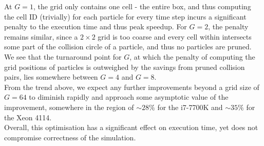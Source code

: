 \documentclass[12pt]{article}
\begin{document}
At $G = 1$, the grid only contains one cell - the entire box, and thus computing the cell ID (trivially) for each particle for every time step incurs a significant penalty to the execution time and thus peak speedup. For $G = 2$, the penalty remains similar, since a $2\times2$ grid is too coarse and every cell within intersects some part of the collision circle of a particle, and thus no particles are pruned. \\

We see that the turnaround point for $G$, at which the penalty of computing the grid positions of particles is outweighed by the savings from pruned collision pairs, lies somewhere between $G = 4$ and $G = 8$. \\

From the trend above, we expect any further improvements beyond a grid size of $G = 64$ to diminish rapidly and approach some asymptotic value of the improvement, somewhere in the region of $\sim28\%$ for the i7-7700K and $\sim35\%$ for the Xeon 4114. \\

Overall, this optimisation has a significant effect on execution time, yet does not compromise correctness of the simulation.
\end{document}
